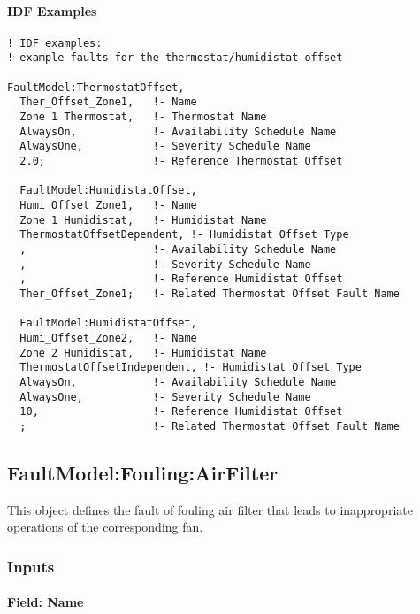 \paragraph{IDF Examples}\label{an-example-of-idf-codes-for-the-thermostathumidistat-offset-fault-models}

\begin{lstlisting}
! IDF examples:
! example faults for the thermostat/humidistat offset

FaultModel:ThermostatOffset,
  Ther_Offset_Zone1,   !- Name
  Zone 1 Thermostat,   !- Thermostat Name
  AlwaysOn,            !- Availability Schedule Name
  AlwaysOne,           !- Severity Schedule Name
  2.0;                 !- Reference Thermostat Offset

  FaultModel:HumidistatOffset,
  Humi_Offset_Zone1,   !- Name
  Zone 1 Humidistat,   !- Humidistat Name
  ThermostatOffsetDependent, !- Humidistat Offset Type
  ,                    !- Availability Schedule Name
  ,                    !- Severity Schedule Name
  ,                    !- Reference Humidistat Offset
  Ther_Offset_Zone1;   !- Related Thermostat Offset Fault Name

  FaultModel:HumidistatOffset,
  Humi_Offset_Zone2,   !- Name
  Zone 2 Humidistat,   !- Humidistat Name
  ThermostatOffsetIndependent, !- Humidistat Offset Type
  AlwaysOn,            !- Availability Schedule Name
  AlwaysOne,           !- Severity Schedule Name
  10,                  !- Reference Humidistat Offset
  ;                    !- Related Thermostat Offset Fault Name
\end{lstlisting}

\subsection{FaultModel:Fouling:AirFilter}\label{faultmodelfoulingairfilter}

This object defines the fault of fouling air filter that leads to inappropriate operations of the corresponding fan.

\subsubsection{Inputs}\label{inputs-8-013}

\paragraph{Field: Name}\label{field-name-8-011}

